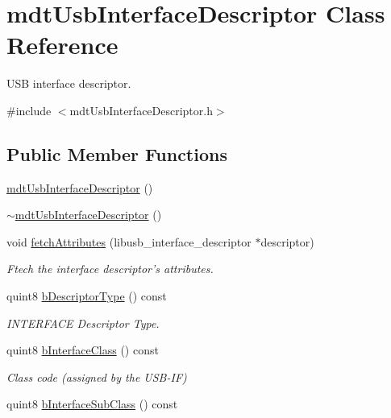 \hypertarget{classmdt_usb_interface_descriptor}{\section{mdt\-Usb\-Interface\-Descriptor Class Reference}
\label{classmdt_usb_interface_descriptor}
}


U\-S\-B interface descriptor.  




{\ttfamily \#include $<$mdt\-Usb\-Interface\-Descriptor.\-h$>$}

\subsection*{Public Member Functions}
\begin{DoxyCompactItemize}
\item 
\hyperlink{classmdt_usb_interface_descriptor_a2f566ab157bd2fe7a0ab5133dc094ed6}{mdt\-Usb\-Interface\-Descriptor} ()
\item 
\hyperlink{classmdt_usb_interface_descriptor_a8b16d95d11a0f29ec35aa8a2fa128edd}{$\sim$mdt\-Usb\-Interface\-Descriptor} ()
\item 
void \hyperlink{classmdt_usb_interface_descriptor_a1050edfdbea744abe0bb4948b16f03fb}{fetch\-Attributes} (libusb\-\_\-interface\-\_\-descriptor $\ast$descriptor)
\begin{DoxyCompactList}\small\item\em Ftech the interface descriptor's attributes. \end{DoxyCompactList}\item 
quint8 \hyperlink{classmdt_usb_interface_descriptor_a32e43e99126954ee6b716d1f0a24b60c}{b\-Descriptor\-Type} () const 
\begin{DoxyCompactList}\small\item\em I\-N\-T\-E\-R\-F\-A\-C\-E Descriptor Type. \end{DoxyCompactList}\item 
quint8 \hyperlink{classmdt_usb_interface_descriptor_a345952007f1822d7decc6b115883a250}{b\-Interface\-Class} () const 
\begin{DoxyCompactList}\small\item\em Class code (assigned by the U\-S\-B-\/\-I\-F) \end{DoxyCompactList}\item 
quint8 \hyperlink{classmdt_usb_interface_descriptor_aad3fbaacba0b0c32daaffb14d52fd05a}{b\-Interface\-Sub\-Class} () const 

\end{DoxyCompactItemize}
